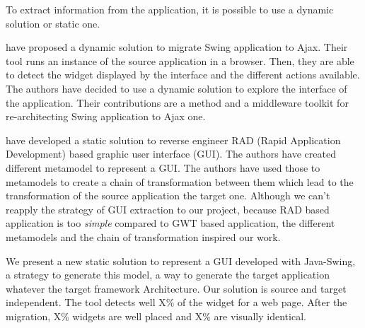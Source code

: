 \documentclass[conference]{IEEEtran}
\begin{document}
    
    To extract information from the application, it is possible to use a dynamic solution or static one. 
    
     \citet{samir2007swing2script} have proposed a dynamic solution to migrate Swing application to Ajax.
    Their tool runs an instance of the source application in a browser.
    Then, they are able to detect the widget displayed by the interface and the different actions available.
    The authors have decided to use a dynamic solution to explore the interface of the application.
    Their contributions are a method and a middleware toolkit for re-architecting Swing application to Ajax one.
    
    \citet{sanchez2014model} have developed a static solution to reverse engineer RAD (Rapid Application Development) based graphic user interface (GUI).
    The authors have created different metamodel to represent a GUI.
    The authors have used those to metamodels to create a chain of transformation between them which lead to the transformation of 
        the source  application the target one.
    Although we can't reapply the strategy of GUI extraction to our project, because RAD based application is too \emph{simple} compared to GWT based application,
        the different metamodels and the chain of transformation inspired our work.
    
    
    We present a new static solution to represent a GUI developed with Java-Swing, 
        a strategy to generate this model,
        a way to generate the target application whatever the target framework Architecture.
    Our solution is source and target independent.
    The tool detects well X\% of the widget for a web page.
    After the migration, X\% widgets are well placed and X\% are visually identical.
    
\end{document}

